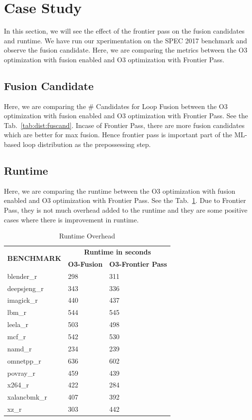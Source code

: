 \section{Case Study}
In this section, we will see the effect of the frontier pass on the fusion candidates and runtime. We have run our xperimentation on the SPEC 2017 benchmark and  observe the fusion candidate. Here, we are comparing the metrics between the O3 optimization with fusion enabled and O3 optimization with Frontier Pass.

\subsection{Fusion Candidate}
Here, we are comparing the \# Candidates for Loop Fusion between the O3 optimization with fusion enabled and O3 optimization with Frontier Pass. See the Tab.~\ref{tab:dist:fuscand}. Incase of Frontier Pass, there are more fusion candidates which are better for max fusion. Hence frontier pass is important part of the ML-based loop distribution as the prepossessing step. 

\subsection{Runtime}
Here, we are comparing the runtime between the O3 optimization with fusion enabled and O3 optimization with Frontier Pass. See the Tab.~\ref{tab:dist:fpruntime}. Due to Frontier Pass,  they is not much overhead added to the runtime and they are some positive cases where there is improvement in runtime.



\begin{table}[h]
\begin{tabular}{|l|l|l|}
\hline
\multirow{2}{*}{\textbf{BENCHMARK}} & \multicolumn{2}{c|}{\textbf{Runtime in seconds}} \\ \cline{2-3} 
 & \textbf{O3-Fusion} & \textbf{O3-Frontier Pass} \\ \hline
blender\_r & 298 & 311 \\ \hline
deepsjeng\_r & 343 & 336 \\ \hline
imagick\_r & 440 & 437 \\ \hline
lbm\_r & 544 & 545 \\ \hline
leela\_r & 503 & 498 \\ \hline
mcf\_r & 542 & 530 \\ \hline
namd\_r & 234 & 239 \\ \hline
omnetpp\_r & 636 & 602 \\ \hline
povray\_r & 459 & 439 \\ \hline
x264\_r & 422 & 284 \\ \hline
xalancbmk\_r & 407 & 392 \\ \hline
xz\_r & 303 & 442 \\ \hline
\end{tabular}
\centering
\caption{Runtime Overhead}
\label{tab:dist:fpruntime}
\end{table}

